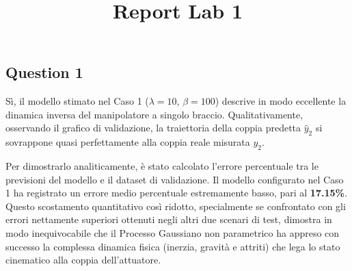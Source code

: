 \documentclass[a4paper,12pt]{article}
\title{Report Lab 1}
\author{}
\date{}
\begin{document}
\maketitle

\subsection*{Question 1}
Sì, il modello stimato nel Caso 1 ($\lambda = 10$, $\beta = 100$) descrive in modo eccellente la dinamica inversa del manipolatore a singolo braccio. Qualitativamente, osservando il grafico di validazione, la traiettoria della coppia predetta $\hat{y}_2$ si sovrappone quasi perfettamente alla coppia reale misurata $y_2$. 

Per dimostrarlo analiticamente, è stato calcolato l'errore percentuale tra le previsioni del modello e il dataset di validazione. Il modello configurato nel Caso 1 ha registrato un errore medio percentuale estremamente basso, pari al \textbf{17.15\%}. Questo scostamento quantitativo così ridotto, specialmente se confrontato con gli errori nettamente superiori ottenuti negli altri due scenari di test, dimostra in modo inequivocabile che il Processo Gaussiano non parametrico ha appreso con successo la complessa dinamica fisica (inerzia, gravità e attriti) che lega lo stato cinematico alla coppia dell'attuatore.
\end{document}
